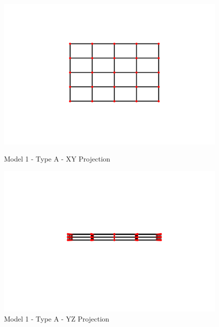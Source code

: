 \begin{figure}[!htbp]
\begin{minipage}{0.3\textwidth}
    \centering
    \includegraphics[width = 1\textwidth]{Figures/M1_type_a_XY.png}
    \caption{Model 1 - Type A - XY Projection}
    \label{fig:M1_a_XY}
\end{minipage}
\hspace{5mm}
\begin{minipage}{0.3\textwidth}
    \centering
    \includegraphics[width = 1\textwidth]{Figures/M1_type_a_YZ.png}
    \caption{Model 1 - Type A - YZ Projection}
    \label{fig:M1_a_YZ}
\end{minipage}
\hspace{5mm}
\begin{minipage}{0.3\textwidth}
    \centering

\end{minipage}
\end{figure}
